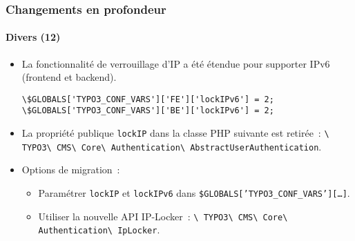 
\begin{frame}[fragile]
	\frametitle{Changements en profondeur}
	\framesubtitle{Divers (12)}

	\lstset{basicstyle=\tiny\ttfamily}

	\begin{itemize}

		\item La fonctionnalité de verrouillage d'IP a été étendue pour supporter IPv6
			(frontend et backend).
\begin{lstlisting}
\$GLOBALS['TYPO3_CONF_VARS']['FE']['lockIPv6'] = 2;
\$GLOBALS['TYPO3_CONF_VARS']['BE']['lockIPv6'] = 2;
\end{lstlisting}

		\item La propriété publique \texttt{lockIP} dans la classe PHP suivante est retirée~:\newline
			\small
				\texttt{\textbackslash
					TYPO3\textbackslash
					CMS\textbackslash
					Core\textbackslash
					Authentication\textbackslash
					AbstractUserAuthentication}.
			\normalsize

		\item Options de migration~:

			\begin{itemize}\smaller
				\item[\ding{228}] Paramétrer \texttt{lockIP} et \texttt{lockIPv6} dans \texttt{\$GLOBALS['TYPO3\_CONF\_VARS'][\ldots]}.
				\item[\ding{228}] Utiliser la nouvelle API IP-Locker~:
					\texttt{\textbackslash
						TYPO3\textbackslash
						CMS\textbackslash
						Core\textbackslash
						Authentication\textbackslash
						IpLocker}.
			\end{itemize}\normalsize

	\end{itemize}

\end{frame}

